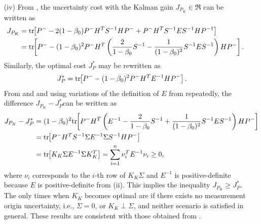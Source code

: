 \begin{appendix}
\begin{itemize}
\item[(iv)] From , the uncertainty cost with the Kalman gain $J_{P_{K}}\in\Re$ can be written as
\begin{align}
\label{eqn:CostKal}
J_{P_{K}}
&=
\mathrm{tr}\negthickspace\left[ P^--2(1-\beta_{0})P^-H^TS^{-1}HP^-+P^-H^TS^{-1}ES^{-1}HP^{-1} \right]\nonumber
\\
&=
\mathrm{tr}\negthickspace\left[ P^--(1-\beta_{0})^2P^-H^T\left(\frac{2}{1-\beta_{0}}S^{-1}-\frac1{(1-\beta_{0})^2}S^{-1}ES^{-1}\right)HP^- \right].
\end{align}
Similarly, the optimal cost $J^*_{P}$ may be rewritten as
\begin{align}
\label{eqn:CostOpt}
J^*_{P}
&=
\mathrm{tr}\negthickspace\left[ P^--(1-\beta_{0})^2P^-H^TE^{-1}HP^- \right].
\end{align}
From  and  and using variations of the definition of $E$ from  repeatedly, the difference $J_{P_K}-J^*_P$can be written as
\begin{align}
J_{P_K}-J^*_P
&=
(1-\beta_{0})^2\mathrm{tr}\negthickspace\left[ P^-H^T\left(E^{-1}-\frac{2}{1-\beta_{0}}S^{-1}+\frac1{(1-\beta_{0})^2}S^{-1}ES^{-1}\right)HP^- \right]
\nonumber
\\
&=
\mathrm{tr}\negthickspace\left[ P^-H^TS^{-1}\Sigma E^{-1}\Sigma S^{-1}HP^- \right]
\nonumber
\\
&
=
\mathrm{tr}\negthickspace\left[ K_K\Sigma E^{-1}\Sigma K_K^T \right]
=\sum\limits_{i=1}^n\nu_i^TE^{-1}\nu_i\geq0,
\end{align}
where $\nu_i$ corresponds to the $i$-th row of $K_K\Sigma$ and $E^{-1}$ is positive-definite because $E$ is positive-definite from (ii).
This implies the inequality $J_{P_{K}}\geq J^*_{P}$.
The only times when $K_K$ becomes optimal are if there exists no measurement origin uncertainty, i.e., $\Sigma=0$, or $K_K\perp\Sigma$, and neither scenario is satisfied in general.
These results are consistent with those obtained from .



\end{itemize}
\end{appendix}
